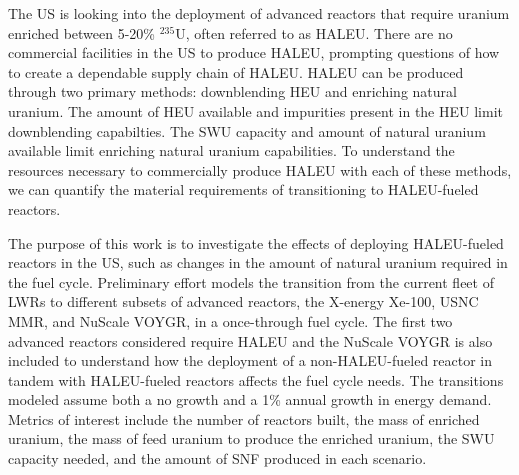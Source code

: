 The US is looking into the deployment of advanced reactors that 
require uranium enriched between 5-20\% $^{235}$U, often referred to 
as \gls{HALEU}. There are no commercial facilities 
in the US to produce \gls{HALEU}, 
prompting questions of how to create a dependable supply chain of \gls{HALEU}. 
\gls{HALEU} can be produced through two primary methods: downblending 
\gls{HEU} and enriching natural uranium. The amount of \gls{HEU} available 
and impurities present in the \gls{HEU} limit downblending capabilties.
The \gls{SWU} capacity and amount of natural uranium available limit 
enriching natural uranium capabilities. To understand the resources necessary 
to commercially produce \gls{HALEU} with each of these methods, we can 
quantify the material requirements of transitioning to \gls{HALEU}-fueled 
reactors. 

The purpose of this work is to investigate the effects of deploying 
\gls{HALEU}-fueled reactors in the US, such as changes in the amount of 
natural uranium required in the fuel cycle. Preliminary effort 
models the transition from the
current fleet of \glspl{LWR} to different subsets of advanced reactors, 
the X-energy Xe-100, \gls{USNC} \gls{MMR}, and NuScale VOYGR,
in a once-through fuel cycle. The first two advanced reactors considered 
require \gls{HALEU} and 
the NuScale VOYGR is also included to understand 
how the deployment of a non-\gls{HALEU}-fueled reactor in tandem with 
\gls{HALEU}-fueled reactors affects the fuel cycle needs. The 
transitions modeled assume both a no growth and a 1\% 
annual growth in energy demand. Metrics of interest include the 
number of reactors built, the mass of enriched uranium, the mass 
of feed uranium to produce the enriched uranium, the \gls{SWU} 
capacity needed, and the amount of \gls{SNF} produced in each scenario. 


